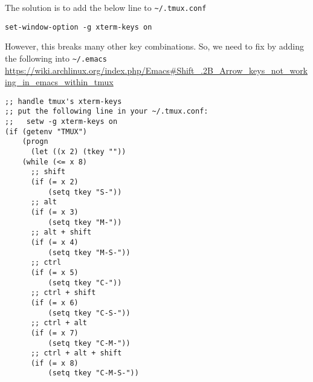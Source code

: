 The solution is to add the below line to \verb!~/.tmux.conf!
\begin{verbatim}
set-window-option -g xterm-keys on
\end{verbatim}
However, this breaks many other key combinations. So, we need to fix by adding
the following into \verb!~/.emacs!
\url{https://wiki.archlinux.org/index.php/Emacs#Shift_.2B_Arrow_keys_not_working_in_emacs_within_tmux}
\begin{verbatim}
;; handle tmux's xterm-keys
;; put the following line in your ~/.tmux.conf:
;;   setw -g xterm-keys on
(if (getenv "TMUX")
    (progn
      (let ((x 2) (tkey ""))
	(while (<= x 8)
	  ;; shift
	  (if (= x 2)
	      (setq tkey "S-"))
	  ;; alt
	  (if (= x 3)
	      (setq tkey "M-"))
	  ;; alt + shift
	  (if (= x 4)
	      (setq tkey "M-S-"))
	  ;; ctrl
	  (if (= x 5)
	      (setq tkey "C-"))
	  ;; ctrl + shift
	  (if (= x 6)
	      (setq tkey "C-S-"))
	  ;; ctrl + alt
	  (if (= x 7)
	      (setq tkey "C-M-"))
	  ;; ctrl + alt + shift
	  (if (= x 8)
	      (setq tkey "C-M-S-"))


\end{verbatim}
